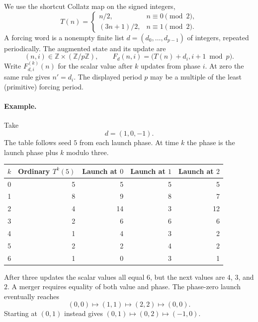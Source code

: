 \documentclass[11pt]{article}
\newcommand{\Z}{\mathbb Z}
\theoremstyle{definition}
\theoremstyle{remark}
\begin{document}
We use the shortcut Collatz map on the signed integers,
\begin{equation}\label{eq:shortcut}
 T(n)=\begin{cases}n/2,&n\equiv0\pmod2,\\
 (3n+1)/2,&n\equiv1\pmod2.
 \end{cases}
\end{equation}
A forcing word is a nonempty
finite list $d=(d_0,\ldots,d_{p-1})$ of integers, repeated periodically.
The augmented state and its update are
\begin{equation}\label{eq:physical-forcing}
 (n,i)\in\Z\times(\Z/p\Z),\qquad
 F_d(n,i)=\bigl(T(n)+d_i,i+1\bmod p\bigr).
\end{equation}
Write $F_{d,i}^{(k)}(n)$ for the scalar value after $k$ updates from
phase $i$. At zero the same rule gives $n'=d_i$. The displayed period
$p$ may be a multiple of the least (primitive) forcing period.

\paragraph{Example.} Take
\begin{equation}\label{eq:three-example-word}
 d=(1,0,-1).
\end{equation}
The table follows seed $5$ from each launch phase. At time $k$ the
phase is the launch phase plus $k$ modulo three.
\begin{center}
\begin{tabular}{rrrrr}\toprule
$k$ & Ordinary $T^k(5)$ & Launch at $0$ & Launch at $1$ & Launch at $2$\\\midrule
0&5&5&5&5\\
1&8&9&8&7\\
2&4&14&3&12\\
3&2&6&6&6\\
4&1&4&3&2\\
5&2&2&4&2\\
6&1&0&3&1\\\bottomrule
\end{tabular}
\end{center}
After three updates the scalar values all equal $6$, but the next
values are $4$, $3$, and $2$. A merger requires equality of both value
and phase. The phase-zero launch eventually reaches
\[
 (0,0)\longmapsto(1,1)\longmapsto(2,2)\longmapsto(0,0).
\]
Starting at $(0,1)$ instead gives $(0,1)\mapsto(0,2)\mapsto(-1,0)$.












\end{document}
